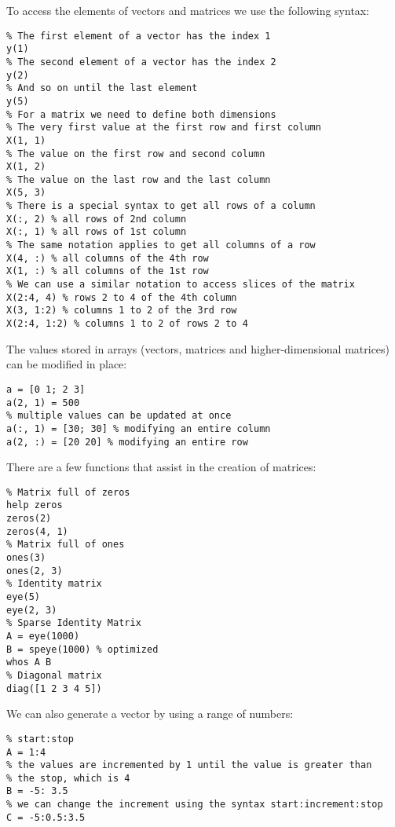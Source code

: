 \documentclass[12pt, a4paper]{article}
\begin{document}
To access the elements of vectors and matrices we use the following syntax:
\lstset{language=matlab,label= ,caption= ,captionpos=b,firstnumber=1,numbers=left,style=Matlab-editor}
\begin{lstlisting}
% The first element of a vector has the index 1
y(1)
% The second element of a vector has the index 2
y(2)
% And so on until the last element
y(5)
% For a matrix we need to define both dimensions
% The very first value at the first row and first column
X(1, 1)
% The value on the first row and second column
X(1, 2)
% The value on the last row and the last column
X(5, 3)
% There is a special syntax to get all rows of a column
X(:, 2) % all rows of 2nd column
X(:, 1) % all rows of 1st column
% The same notation applies to get all columns of a row
X(4, :) % all columns of the 4th row
X(1, :) % all columns of the 1st row
% We can use a similar notation to access slices of the matrix
X(2:4, 4) % rows 2 to 4 of the 4th column
X(3, 1:2) % columns 1 to 2 of the 3rd row
X(2:4, 1:2) % columns 1 to 2 of rows 2 to 4
\end{lstlisting}

The values stored in arrays (vectors, matrices and higher-dimensional matrices) can be modified in place:
\lstset{language=matlab,label= ,caption= ,captionpos=b,firstnumber=1,numbers=left,style=Matlab-editor}
\begin{lstlisting}
a = [0 1; 2 3]
a(2, 1) = 500
% multiple values can be updated at once
a(:, 1) = [30; 30] % modifying an entire column
a(2, :) = [20 20] % modifying an entire row
\end{lstlisting}

There are a few functions that assist in the creation of matrices:
\lstset{language=matlab,label= ,caption= ,captionpos=b,firstnumber=1,numbers=left,style=Matlab-editor}
\begin{lstlisting}
% Matrix full of zeros
help zeros
zeros(2)
zeros(4, 1)
% Matrix full of ones
ones(3)
ones(2, 3)
% Identity matrix
eye(5)
eye(2, 3)
% Sparse Identity Matrix
A = eye(1000)
B = speye(1000) % optimized
whos A B
% Diagonal matrix
diag([1 2 3 4 5])
\end{lstlisting}

We can also generate a vector by using a range of numbers:
\lstset{language=matlab,label= ,caption= ,captionpos=b,firstnumber=1,numbers=left,style=Matlab-editor}
\begin{lstlisting}
% start:stop
A = 1:4
% the values are incremented by 1 until the value is greater than
% the stop, which is 4
B = -5: 3.5
% we can change the increment using the syntax start:increment:stop
C = -5:0.5:3.5
\end{lstlisting}
\end{document}
